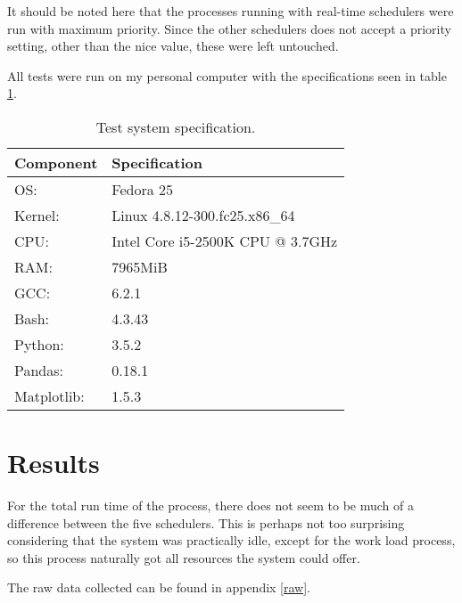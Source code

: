 \documentclass[12pt, a4paper]{article} %
\begin{document}
It should be noted here that the processes running with real-time schedulers were run with maximum priority.
Since the other schedulers does not accept a priority setting, other than the nice value, these were left untouched.

All tests were run on my personal computer with the specifications seen in table \ref{spec}.

\begin{table}[h]
	\centering
	\begin{tabular}{ll}
		Component & Specification \\
		\hline
		OS: & Fedora 25 \\
		Kernel: & Linux 4.8.12-300.fc25.x86\_64 \\
		CPU: & Intel Core i5-2500K CPU @ 3.7GHz \\
		RAM: & 7965MiB \\
		GCC: & 6.2.1 \\
		Bash: & 4.3.43 \\
		Python: & 3.5.2 \\
		Pandas: & 0.18.1 \\
		Matplotlib: & 1.5.3
	\end{tabular}
	\caption{Test system specification.}
	\label{spec}
\end{table}



\section{Results}

For the total run time of the process, there does not seem to be much of a difference between the five schedulers.
This is perhaps not too surprising considering that the system was practically idle, except for the work load process, so this process naturally got all resources the system could offer.



The raw data collected can be found in appendix \ref{raw}.









\end{document}
